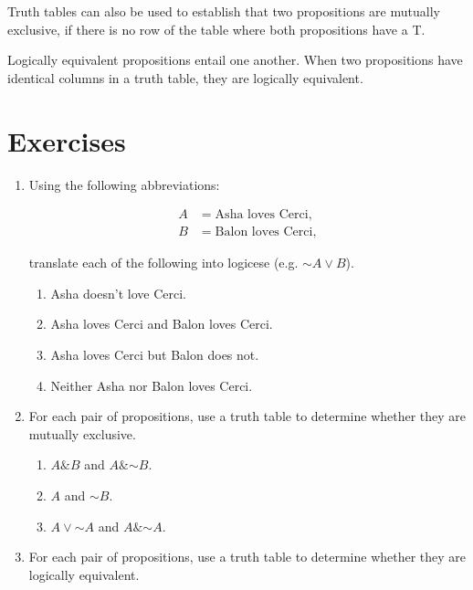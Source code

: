 \documentclass[justified]{tufte-book}
\providecommand{\tightlist}{%
  \setlength{\itemsep}{0pt}\setlength{\parskip}{0pt}}
\renewcommand{\neg}{\mathbin{\sim}}
\renewcommand{\wedge}{\mathbin{\&}}
\theoremstyle{definition}
\theoremstyle{definition}
\theoremstyle{definition}
\theoremstyle{remark}
\begin{document}
Truth tables can also be used to establish that two propositions are
mutually exclusive, if there is no row of the table where both
propositions have a T.

Logically equivalent propositions entail one another. When two
propositions have identical columns in a truth table, they are logically
equivalent.

\hypertarget{exercises-2}{%
\section*{Exercises}\label{exercises-2}}

\begin{enumerate}
\item
  Using the following abbreviations:

  \[
    \begin{aligned}
       A &= \mbox{Asha loves Cerci},\\
       B &= \mbox{Balon loves Cerci},
    \end{aligned}
  \]

  translate each of the following into logicese (e.g.
  \(\neg A \vee B\)).

  \begin{enumerate}
  \def\labelenumii{\alph{enumii}.}
  \tightlist
  \item
    Asha doesn't love Cerci.
  \item
    Asha loves Cerci and Balon loves Cerci.
  \item
    Asha loves Cerci but Balon does not.
  \item
    Neither Asha nor Balon loves Cerci.
  \end{enumerate}
\item
  For each pair of propositions, use a truth table to determine whether
  they are mutually exclusive.

  \begin{enumerate}
  \def\labelenumii{\alph{enumii}.}
  \tightlist
  \item
    \(A \wedge B\) and \(A \wedge \neg B\).
  \item
    \(A\) and \(\neg B\).
  \item
    \(A \vee \neg A\) and \(A \wedge \neg A\).
  \end{enumerate}
\item
  For each pair of propositions, use a truth table to determine whether
  they are logically equivalent.


\end{enumerate}
\end{document}
